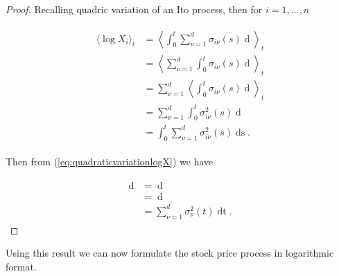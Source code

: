 \documentclass[british]{amsart} \usepackage{lmodern}
\numberwithin{equation}{section} \numberwithin{figure}{section}
\theoremstyle{plain} \newtheorem{thm}{\protect\theoremname}[section]
\theoremstyle{definition} \newtheorem{defn}[thm]{\protect\definitionname}
\theoremstyle{plain} \newtheorem{assumption}[thm]{\protect\assumptionname}
\theoremstyle{plain} \newtheorem{lem}[thm]{\protect\lemmaname}
\theoremstyle{plain} \newtheorem{prop}[thm]{\protect\propositionname}
\theoremstyle{remark} \newtheorem{rem}[thm]{\protect\remarkname}
\theoremstyle{plain} \newtheorem{cor}[thm]{\protect\corollaryname}
\renewcommand{\d}[1]{\mathop{\mathrm{d}{#1}}}
\newcommand{\rangei}{i=1,\dots,n} \newcommand{\measure}{\mathbb{P}}
\begin{document}
\begin{proof} 

Recalling quadric variation of an Ito process, then for $\rangei$

  \begin{gather} 
    \begin{split} 
      \label{eq:quadraticvariationlogX} 
          \langle \log{X_{i}} \rangle_{t} 
& = \left< \int_{0}^{t} \sum_{\nu=1}^{d} \sigma_{i\nu}(s) \d{W_{\nu}(s)} \right>_{t} \\ 
& = \left< \sum_{\nu=1}^{d} \int_{0}^{t} \sigma_{i\nu}(s) \d{W_{\nu}(s)} \right>_{t} \\ 
& = \sum_{\nu=1}^{d} \left< \int_{0}^{t} \sigma_{i\nu}(s) \d{W_{\nu}(s)} \right>_{t} \\ 
& = \sum_{\nu=1}^{d} \int_{0}^{t} \sigma_{i\nu}^{2}(s) \d{\langle W_{\nu}(s) \rangle} \\
& = \int_{0}^{t} \sum_{\nu=1}^{d} \sigma_{i\nu}^{2}(s) \d{s}. 
    \end{split}
  \end{gather}
  
  Then from (\ref{eq:quadraticvariationlogX}) we have
  
  \begin{gather} 
    \begin{split} 
      \d{\langle \log{X} \rangle_{t}} 
& =\d{\left<\int_{0}^{t} \sum_{\nu=1}^{d} \sigma_{\nu}(s) \d{W_{\nu}(s)}\right>_{t}} \\ 
& = \d{\left(\int_{0}^{t} \sum_{\nu=1}^{d} \sigma_{\nu}^{2}(s) \d{s}\right)} \\ & = \sum_{\nu=1}^{d} \sigma_{\nu}^{2}(t)\d{t}.
    \end{split} 
  \end{gather}

\end{proof}

Using this result we can now formulate the stock price process in logarithmic
format.
\end{document}
